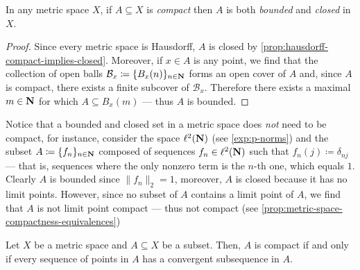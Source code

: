 \begin{corollary}
\label{cor:metric-space-compact-implies-bounded-closed}
In any metric space \(X\), if \(A \subseteq X\) is \emph{compact} then \(A\) is
both \emph{bounded} and \emph{closed} in \(X\).
\end{corollary}

\begin{proof}
Since every metric space is Hausdorff, \(A\) is closed by
\cref{prop:hausdorff-compact-implies-closed}. Moreover, if \(x \in A\) is any
point, we find that the collection of open balls \(\mathcal{B}_x \coloneq
\{B_x(n)\}_{n \in \mathbf{N}}\) forms an open cover of \(A\) and, since \(A\) is
compact, there exists a finite subcover of \(\mathcal{B}_x\). Therefore there
exists a maximal \(m \in \mathbf{N}\) for which \(A \subseteq B_x(m)\) --- thus \(A\) is
bounded.
\end{proof}

\begin{remark}
\label{rem:closed-and-bounded-not-compact}
Notice that a bounded and closed set in a metric space does \emph{not} need to
be compact, for instance, consider the space \(\ell^2(\mathbf{N})\) (see
\cref{exp:p-norms}) and the subset \(A \coloneq \{f_n\}_{n \in \mathbf{N}}\) composed of
sequences \(f_n \in \ell^2(\mathbf{N})\) such that \(f_n(j) \coloneq \delta_{n j}\) ---
that is, sequences where the only nonzero term is the \(n\)-th one, which equals
\(1\). Clearly \(A\) is bounded since \(\| f_{n} \|_2 = 1\), moreover, \(A\) is
closed because it has no limit points. However, since no subset of \(A\)
contains a limit point of \(A\), we find that \(A\) is not limit point compact
--- thus not compact (see \cref{prop:metric-space-compactness-equivalences})
\end{remark}

\begin{proposition}
\label{prop:convergent-subsequence-implies-compact}
Let \(X\) be a metric space and \(A \subseteq X\) be a subset. Then, \(A\) is
compact if and only if every sequence of points in \(A\) has a convergent
subsequence in \(A\).
\end{proposition}




